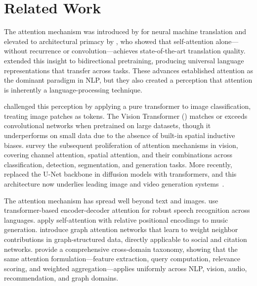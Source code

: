 \section{Related Work}
\label{sec:related}

The attention mechanism was introduced by \citet{bahdanau2014neural} for neural machine translation and elevated to architectural primacy by \citet{vaswani2017attention}, who showed that self-attention alone---without recurrence or convolution---achieves state-of-the-art translation quality. \citet{devlin2019bert} extended this insight to bidirectional pretraining, producing universal language representations that transfer across tasks. These advances established attention as the dominant paradigm in NLP, but they also created a perception that attention is inherently a language-processing technique.

\citet{dosovitskiy2021image} challenged this perception by applying a pure transformer to image classification, treating image patches as tokens. The Vision Transformer (\vit) matches or exceeds convolutional networks when pretrained on large datasets, though it underperforms on small data due to the absence of built-in spatial inductive biases. \citet{guo2022attention} survey the subsequent proliferation of attention mechanisms in vision, covering channel attention, spatial attention, and their combinations across classification, detection, segmentation, and generation tasks. More recently, \citet{peebles2023scalable} replaced the U-Net backbone in diffusion models with transformers, and this architecture now underlies leading image and video generation systems~\citep{esser2024stable}.

The attention mechanism has spread well beyond text and images. \citet{radford2022whisper} use transformer-based encoder-decoder attention for robust speech recognition across languages. \citet{huang2018music} apply self-attention with relative positional encodings to music generation. \citet{velickovic2018graph} introduce graph attention networks that learn to weight neighbor contributions in graph-structured data, directly applicable to social and citation networks. \citet{brauwers2022survey} provide a comprehensive cross-domain taxonomy, showing that the same attention formulation---feature extraction, query computation, relevance scoring, and weighted aggregation---applies uniformly across NLP, vision, audio, recommendation, and graph domains.

